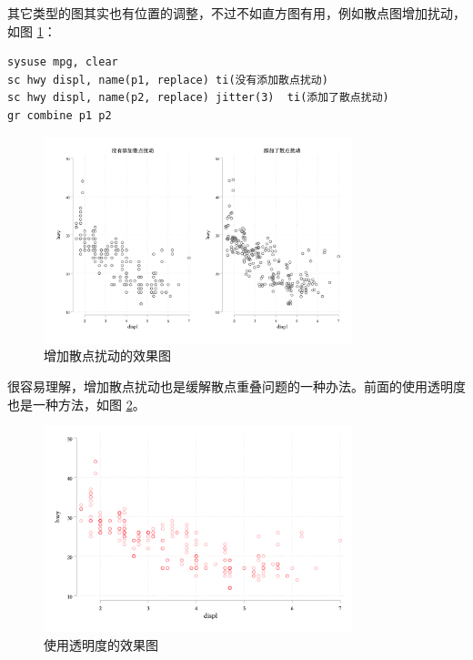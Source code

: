 \documentclass[]{ctexbook}
\begin{document}
其它类型的图其实也有位置的调整，不过不如直方图有用，例如散点图增加扰动，如图 \ref{fig:scjitter}：

\begin{lstlisting}
sysuse mpg, clear
sc hwy displ, name(p1, replace) ti(没有添加散点扰动)
sc hwy displ, name(p2, replace) jitter(3)  ti(添加了散点扰动)
gr combine p1 p2
\end{lstlisting}

\begin{figure}

{\centering \includegraphics[width=0.8\textwidth]{assets/scjitter} 

}

\caption{增加散点扰动的效果图}\label{fig:scjitter}
\end{figure}

很容易理解，增加散点扰动也是缓解散点重叠问题的一种办法。前面的使用透明度也是一种方法，如图 \ref{fig:scopc}。

\begin{figure}

{\centering \includegraphics[width=0.8\textwidth]{assets/scopc} 

}

\caption{使用透明度的效果图}\label{fig:scopc}
\end{figure}
\end{document}
